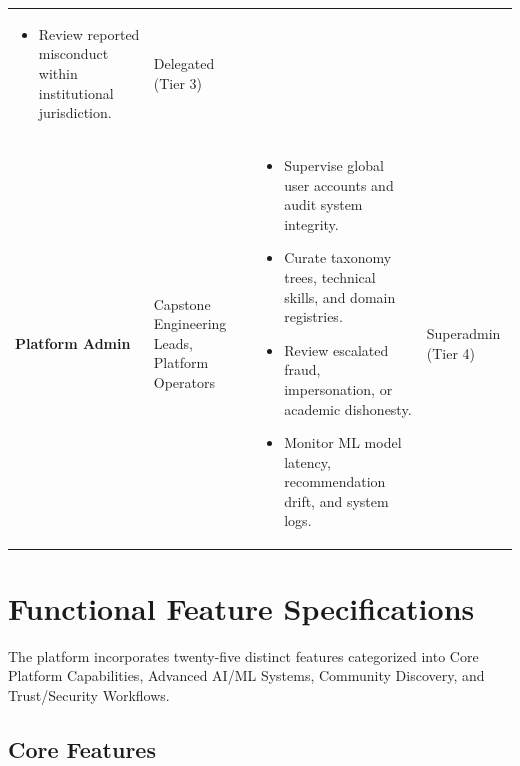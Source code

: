 \documentclass[11pt,a4paper]{article}
\begin{document}
\begin{table}[htbp]
\begin{tabularx}{\textwidth}{@{}l p{3.2cm} X l@{}}
\begin{itemize}[leftmargin=*,noitemsep]
    \item Review reported misconduct within institutional jurisdiction.
\end{itemize} & Delegated (Tier 3) \\
\addlinespace
\textbf{Platform Admin} & Capstone Engineering Leads, Platform Operators & 
\begin{itemize}[leftmargin=*,noitemsep]
    \item Supervise global user accounts and audit system integrity.
    \item Curate taxonomy trees, technical skills, and domain registries.
    \item Review escalated fraud, impersonation, or academic dishonesty.
    \item Monitor ML model latency, recommendation drift, and system logs.
\end{itemize} & Superadmin (Tier 4) \\
\bottomrule
\end{tabularx}
\end{table}

\section{Functional Feature Specifications}

The platform incorporates twenty-five distinct features categorized into Core Platform Capabilities, Advanced AI/ML Systems, Community Discovery, and Trust/Security Workflows.

\subsection{Core Features}
\end{document}

